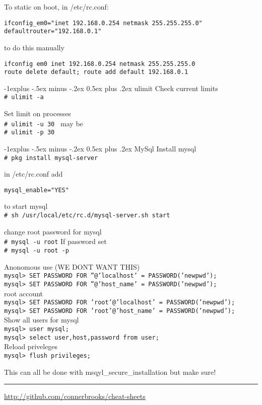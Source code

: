 \documentclass[10pt,landscape]{article}
\makeatletter
\newcommand{\shellcmd}[1]{\\\indent\indent\texttt{\footnotesize #1}}
\renewcommand{\subsection}{\@startsection{subsection}{2}{0mm}%
                                {-1explus -.5ex minus -.2ex}%
                                {0.5ex plus .2ex}%
                                {\normalfont\normalsize\bfseries}}
\makeatother
\begin{document}
\begin{multicols}{3}
To static on boot, in /etc/rc.conf:
\begin{verbatim}
ifconfig_em0="inet 192.168.0.254 netmask 255.255.255.0"
defaultrouter="192.168.0.1"
\end{verbatim}

to do this manually 
\begin{verbatim}
ifconfig em0 inet 192.168.0.254 netmask 255.255.255.0
route delete default; route add default 192.168.0.1
\end{verbatim}


\subsection{ulimit}
Check current limits
\shellcmd{\# ulimit -a }

Set limit on processes
\shellcmd{\# ulimit -u 30 }
may be
\shellcmd{\# ulimit -p 30 }


\subsection{MySql}
Install mysql
\shellcmd{\# pkg install mysql-server }

in /etc/rc.conf add
\begin{verbatim}
mysql_enable="YES"
\end{verbatim}


to start mysql
\shellcmd{\# sh /usr/local/etc/rc.d/mysql-server.sh start}


change root password for mysql
\shellcmd{\# mysql -u root}
If password set
\shellcmd{\# mysql -u root -p}

Anonomous use (WE DONT WANT THIS)
\shellcmd{mysql> SET PASSWORD FOR ''@'localhost' = PASSWORD('newpwd');}
\shellcmd{mysql> SET PASSWORD FOR ''@'host\_name' = PASSWORD('newpwd');} \\

root account
\shellcmd{mysql> SET PASSWORD FOR 'root'@'localhost' = PASSWORD('newpwd');}
\shellcmd{mysql> SET PASSWORD FOR 'root'@'host\_name' = PASSWORD('newpwd');} \\


Show all users for mysql
\shellcmd{mysql> user mysql;}
\shellcmd{mysql> select user,host,password from user;} \\

Reload priveleges
\shellcmd{mysql> flush privileges;}


This can all be done with msqyl\_secure\_installation but make sure!

\rule{0.3\linewidth}{0.25pt}
\scriptsize


\href{http://github.com/connerbrooks/cheat-sheets}{http://github.com/connerbrooks/cheat-sheets}

\end{multicols}
\end{document}
